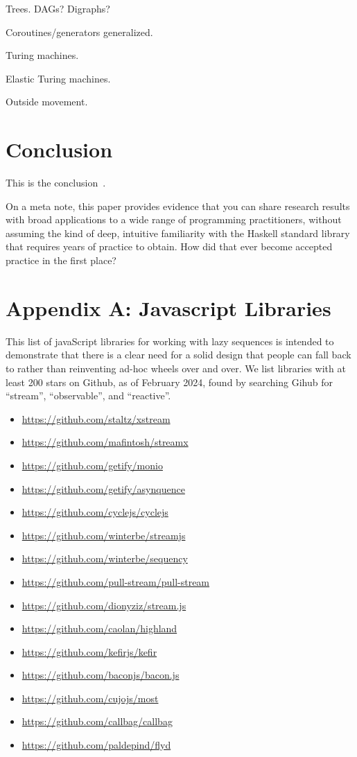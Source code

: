 \documentclass[sigplan,screen,10pt,anonymous,review]{acmart}
\begin{document}
Trees. DAGs? Digraphs?

Coroutines/generators generalized.

Turing machines.

Elastic Turing machines.

Outside movement.

\section{Conclusion}\label{conclusion}

This is the conclusion~\cite{minsky2003set}.

On a meta note, this paper provides evidence that you can share research results with broad applications to a wide range of programming practitioners, without assuming the kind of deep, intuitive familiarity with the Haskell standard library that requires years of practice to obtain. How did that ever become accepted practice in the first place?

\section{Appendix A: Javascript Libraries}\label{wtfjs}

This list of javaScript libraries for working with lazy sequences is intended to demonstrate that there is a clear need for a solid design that people can fall back to rather than reinventing ad-hoc wheels over and over. We list libraries with at least 200 stars on Github, as of February 2024, found by searching Gihub for ``stream'', ``observable'', and ``reactive''.

\begin{itemize}
    \item \url{https://github.com/staltz/xstream}
    \item \url{https://github.com/mafintosh/streamx}
    \item \url{https://github.com/getify/monio}
    \item \url{https://github.com/getify/asynquence}
    \item \url{https://github.com/cyclejs/cyclejs}
    \item \url{https://github.com/winterbe/streamjs}
    \item \url{https://github.com/winterbe/sequency}
    \item \url{https://github.com/pull-stream/pull-stream}
    \item \url{https://github.com/dionyziz/stream.js}
    \item \url{https://github.com/caolan/highland}
    \item \url{https://github.com/kefirjs/kefir}
    \item \url{https://github.com/baconjs/bacon.js}
    \item \url{https://github.com/cujojs/most}
    \item \url{https://github.com/callbag/callbag}
    \item \url{https://github.com/paldepind/flyd}
\end{itemize}
    
\end{document}
